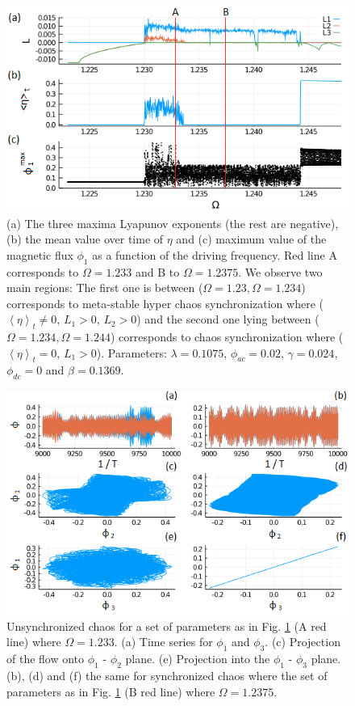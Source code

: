 \documentclass[aps,pre,reprint,groupedaddress]{revtex4-1}
\begin{document}
\begin{figure}
	\includegraphics[scale=0.8]{Fig01}
	\caption{(a) The three maxima Lyapunov exponents (the rest are negative), (b) the mean value over time of $\eta$ and (c) maximum value of the magnetic flux $\phi_{1}$ as a function of the driving frequency. Red line A corresponds to $\Omega = 1.233$ and B to $\Omega = 1.2375$. We observe two main regions: The first one is between ($\Omega=1.23,\Omega=1.234$) corresponds to meta-stable hyper chaos synchronization where ($\left\langle \eta\right\rangle _{t} \neq 0$, $L_{1} > 0$, $L_{2} > 0$) and the second one lying between ($\Omega=1.234,\Omega=1.244$) corresponds to chaos synchronization where ($\left\langle \eta\right\rangle _{t} = 0$, $L_{1} > 0$). Parameters: $\lambda=0.1075$, $\phi_{ac}=0.02$, $\gamma=0.024$, $\phi_{dc}=0$ and $\beta=0.1369$.} \label{fig01}
\end{figure} 

\begin{figure}
	\includegraphics[scale=0.55]{Fig02}%
	\caption{Unsynchronized chaos for a set of parameters as in Fig. \ref{fig01} (A red line) where $ \Omega = 1.233$. (a) Time series for $\phi_{1}$ and $\phi_{3}$. (c) Projection of the flow onto $\phi_{1}$ - $\phi_{2}$ plane. (e) Projection into the $\phi_{1}$ - $\phi_{3}$ plane. (b), (d) and (f) the same for synchronized chaos where the set of parameters as in Fig. \ref{fig01} (B red line) where $\Omega = 1.2375$.} \label{fig02}
\end{figure}
\end{document}
